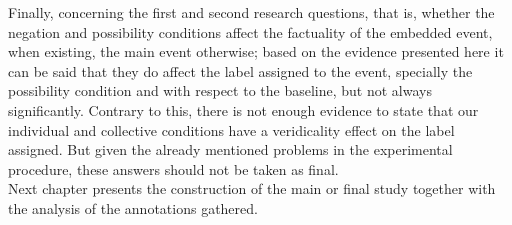 Finally, concerning the first and second research questions, that is, whether the negation and possibility conditions affect the factuality of the embedded event, when existing, the main event otherwise; based on the evidence presented here it can be said that they do affect the label assigned to the event, specially the possibility condition and with respect to the baseline, but not always significantly. Contrary to this, there is not enough evidence to state that our individual and collective conditions have a veridicality effect on the label assigned. But given the already mentioned problems in the experimental procedure, these answers should not be taken as final.\\

Next chapter presents the construction of the main or final study together with the analysis of the annotations gathered.